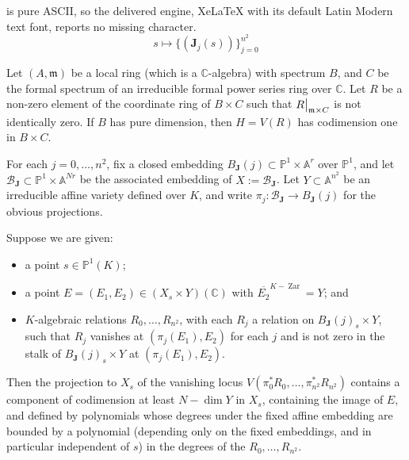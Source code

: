 \documentclass[10pt,a4paper]{amsart}
\newcommand{\C}{\mathbb{C}}
\newcommand\restr[2]{{
	\left.\kern-\nulldelimiterspace
	#1
	\vphantom{\big|}
	\right|_{#2}
	}}
\begin{document}
is pure ASCII, so the delivered engine, XeLaTeX with its default Latin Modern text font, reports no missing character.
\begin{equation}
\label{BGgrapheq}
s \mapsto \{ (\mathbf{J}_{j}(s)) \}^{n^2}_{j=0} 
\end{equation}

\begin{lem}\label{lemmacodim}
    Let $(A,\mathfrak{m})$ be a local ring (which is a $\C$-algebra) with spectrum $B$, and $C$ be the formal spectrum of an irreducible formal power series ring over $\C$. Let $R$ be a non-zero element of the coordinate ring of $B\times C$ such that $\restr{R}{\mathfrak{m}\times C}$ is not identically zero. If $B$ has pure dimension, then $H=V(R)$ has codimension one in $B\times C$. 
\end{lem}

\begin{lem}
\label{deeplemma}
For each $j = 0, \hdots, n^2$, fix a closed embedding $B_{\mathbf{J}}(j) \subset \mathbb{P}^1 \times \mathbb{A}^{r}$ over $\mathbb{P}^1$, and let $\mathcal{B}_{\mathbf{J}} \subset \mathbb{P}^1 \times \mathbb{A}^{Nr}$ be the associated embedding of $X := \mathcal{B}_{\mathbf{J}}$. Let $Y \subset \mathbb{A}^{n^2}$ be an irreducible affine variety defined over $K$, and write $\pi_{j} : \mathcal{B}_{\mathbf{J}} \to B_{\mathbf{J}}(j)$ for the obvious projections.


Suppose we are given: 
\begin{itemize}
    \item a point $s \in \mathbb{P}^1(K)$;
    \item a point $E = (E_{1}, E_{2}) \in (X_{s} \times Y)(\mathbb{C})$ with $\overline{E_{2}}^{K-\operatorname{Zar}} = Y$; and
    \item $K$-algebraic relations $R_{0}, \hdots, R_{n^2}$, with each $R_{j}$ a relation on $B_{\mathbf{J}}(j)_{s} \times Y$, such that $R_{j}$ vanishes at $(\pi_{j}(E_{1}), E_{2})$ for each $j$ and is not zero in the stalk of $B_{\mathbf{J}}(j)_{s} \times Y$ at $(\pi_{j}(E_{1}), E_{2})$.
\end{itemize}
Then the projection to $X_{s}$ of the vanishing locus $V(\pi_{0}^{*} R_{0}, \hdots, \pi^{*}_{n^2} R_{n^2})$ contains a component of codimension at least $N - \dim Y$ in $X_{s}$, containing the image of $E$, and defined by polynomials whose degrees under the fixed affine embedding are bounded by a polynomial (depending only on the fixed embeddings, and in particular independent of $s$) in the degrees of the $R_{0}, \hdots, R_{n^2}$.
\end{lem}
\end{document}
